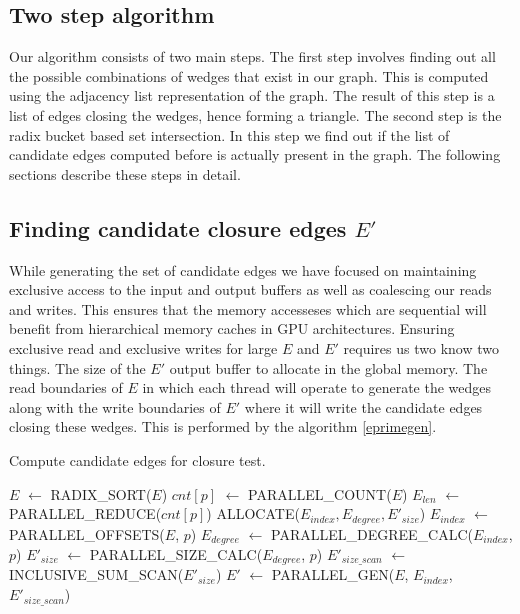 \documentclass[conference]{IEEEtran}
\begin{document}
\subsection{Two step algorithm}
Our algorithm consists of two main steps. The first step involves finding out all the possible combinations of wedges that exist in our graph. This is computed using the adjacency list representation of the graph. The result of this step is a list of edges closing the wedges, hence forming a triangle. The second step is the radix bucket based set intersection. In this step we find out if the list of candidate edges computed before is actually present in the graph. The following sections describe these steps in detail.

\subsection{Finding candidate closure edges $E'$}
While generating the set of candidate edges we have focused on maintaining exclusive access to the input and output buffers as well as coalescing our reads and writes. This ensures that the memory accesseses which are sequential  will benefit from hierarchical memory caches in GPU architectures. Ensuring exclusive read and exclusive writes for large $E$ and $E'$ requires us two know two things. The size of the $E'$ output buffer to allocate in the global memory. The read boundaries of $E$ in which each thread will operate to generate the wedges along with the write boundaries of $E'$ where it will write the candidate edges closing these wedges. This is performed by the algorithm \ref{eprimegen}.

\begin{algorithm}
  \caption{Compute candidate edges for closure test.\label{eprimegen}}  
  \begin{algorithmic}[1]
    \Statex
      \State $E$ $\gets$ RADIX\_SORT($E$)  \label{cubs_radix_sort}
      \State $cnt[p]$ $\gets$ PARALLEL\_COUNT($E$)  \label{par_cnt}
      \State $E_{len}$ $\gets$ PARALLEL\_REDUCE($cnt[p]$) \label{par_red}
      \State ALLOCATE($E_{index}, E_{degree}, E'_{size}$) 
      \State $E_{index}$ $\gets$ PARALLEL\_OFFSETS($E$, $p$) \label{par_offset}
      \State $E_{degree}$ $\gets$ PARALLEL\_DEGREE\_CALC($E_{index}$, $p$) \label{par_deg_calc}
      \State $E'_{size}$ $\gets$ PARALLEL\_SIZE\_CALC($E_{degree}$, $p$) \label{par_size_calc}
      \State $E'_{size\_scan}$ $\gets$ INCLUSIVE\_SUM\_SCAN($E'_{size}$)
      \State $E'$ $\gets$ PARALLEL\_GEN($E$, $E_{index}$, $E'_{size\_scan}$) \label{par_gen}
      \State {}
    \EndFunction
  \end{algorithmic}
\end{algorithm}
\end{document}
